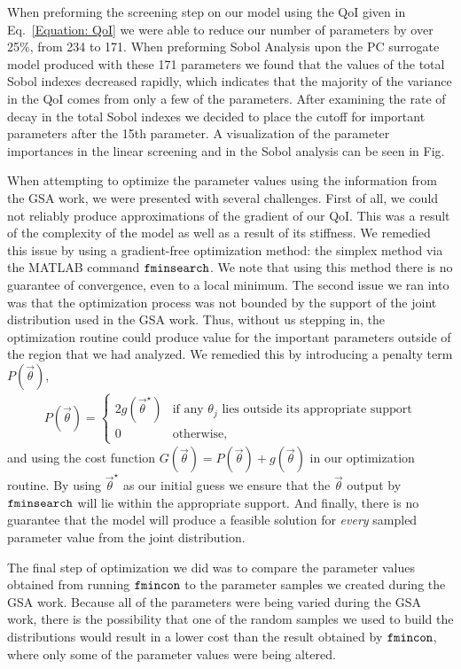 \documentclass[10pt,letterpaper]{article}
\begin{document}
	When preforming the screening step on our model using the QoI given in Eq.~\eqref{Equation: QoI} we were able to reduce our number of parameters by over 25\%, from 234 to 171. When preforming Sobol Analysis upon the PC surrogate model produced with these 171 parameters we found that the values of the total Sobol indexes decreased rapidly, which indicates that the majority of the variance in the QoI comes from only a few of the parameters. After examining the rate of decay in the total Sobol indexes we decided to place the cutoff for important parameters after the 15th parameter. A visualization of the parameter importances in the linear screening and in the Sobol analysis can be seen in Fig.
	
	When attempting to optimize the parameter values using the information from the GSA work, we were presented with several challenges. First of all, we could not reliably produce approximations of the gradient of our QoI. This was a result of the complexity of the model as well as a result of its stiffness. We remedied this issue by using a gradient-free optimization method: the simplex method via the MATLAB command $\verb|fminsearch|$. We note that using this method there is no guarantee of convergence, even to a local minimum. The second issue we ran into was that the optimization process was not bounded by the support of the joint distribution used in the GSA work. Thus, without us stepping in, the optimization routine could produce value for the important parameters outside of the region that we had analyzed. We remedied this by introducing a penalty term $P(\vec{\theta})$,
	\begin{align}
		P(\vec{\theta})= 
		\begin{cases}
			2g(\vec{\theta}^\star) & \text{if any } \theta_j \text{ lies outside its appropriate support}\\
			0           & \text{otherwise},
		\end{cases}
	\end{align}
	and using the cost function $G(\vec{\theta})=P(\vec{\theta})+g(\vec{\theta})$ in our optimization routine. By using $\vec{\theta}^\star$ as our initial guess we ensure that the $\vec{\theta}$ output by $\verb|fminsearch|$ will lie within the appropriate support. And finally, there is no guarantee that the model will produce a feasible solution for \textit{every} sampled parameter value from the joint distribution.
	
	The final step of optimization we did was to compare the parameter values obtained from running $\verb|fmincon|$ to the parameter samples we created during the GSA work. Because all of the parameters were being varied during the GSA work, there is the possibility that one of the random samples we used to build the distributions would result in a lower cost than the result obtained by $\verb|fmincon|$, where only some of the parameter values were being altered. 
	
\end{document}
